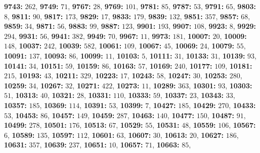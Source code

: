 \textsf{\bfseries 9743:} $262$, \textsf{\bfseries 9749:} $71$, \textsf{\bfseries 9767:} $28$, \textsf{\bfseries 9769:} $101$, \textsf{\bfseries 9781:} $85$, \textsf{\bfseries 9787:} $53$, \textsf{\bfseries 9791:} $65$, \textsf{\bfseries 9803:} $8$, \textsf{\bfseries 9811:} $90$, \textsf{\bfseries 9817:} $173$, \textsf{\bfseries 9829:} $17$, \textsf{\bfseries 9833:} $179$, \textsf{\bfseries 9839:} $132$, \textsf{\bfseries 9851:} $357$, \textsf{\bfseries 9857:} $68$, \textsf{\bfseries 9859:} $34$, \textsf{\bfseries 9871:} $56$, \textsf{\bfseries 9883:} $99$, \textsf{\bfseries 9887:} $123$, \textsf{\bfseries 9901:} $193$, \textsf{\bfseries 9907:} $108$, \textsf{\bfseries 9923:} $8$, \textsf{\bfseries 9929:} $294$, \textsf{\bfseries 9931:} $56$, \textsf{\bfseries 9941:} $382$, \textsf{\bfseries 9949:} $70$, \textsf{\bfseries 9967:} $11$, \textsf{\bfseries 9973:} $181$, \textsf{\bfseries 10007:} $20$, \textsf{\bfseries 10009:} $148$, \textsf{\bfseries 10037:} $242$, \textsf{\bfseries 10039:} $582$, \textsf{\bfseries 10061:} $109$, \textsf{\bfseries 10067:} $45$, \textsf{\bfseries 10069:} $24$, \textsf{\bfseries 10079:} $55$, \textsf{\bfseries 10091:} $137$, \textsf{\bfseries 10093:} $86$, \textsf{\bfseries 10099:} $11$, \textsf{\bfseries 10103:} $5$, \textsf{\bfseries 10111:} $31$, \textsf{\bfseries 10133:} $31$, \textsf{\bfseries 10139:} $93$, \textsf{\bfseries 10141:} $34$, \textsf{\bfseries 10151:} $59$, \textsf{\bfseries 10159:} $86$, \textsf{\bfseries 10163:} $57$, \textsf{\bfseries 10169:} $240$, \textsf{\bfseries 10177:} $109$, \textsf{\bfseries 10181:} $215$, \textsf{\bfseries 10193:} $43$, \textsf{\bfseries 10211:} $329$, \textsf{\bfseries 10223:} $17$, \textsf{\bfseries 10243:} $58$, \textsf{\bfseries 10247:} $30$, \textsf{\bfseries 10253:} $280$, \textsf{\bfseries 10259:} $34$, \textsf{\bfseries 10267:} $32$, \textsf{\bfseries 10271:} $422$, \textsf{\bfseries 10273:} $11$, \textsf{\bfseries 10289:} $363$, \textsf{\bfseries 10301:} $93$, \textsf{\bfseries 10303:} $51$, \textsf{\bfseries 10313:} $40$, \textsf{\bfseries 10321:} $28$, \textsf{\bfseries 10331:} $110$, \textsf{\bfseries 10333:} $59$, \textsf{\bfseries 10337:} $23$, \textsf{\bfseries 10343:} $33$, \textsf{\bfseries 10357:} $185$, \textsf{\bfseries 10369:} $114$, \textsf{\bfseries 10391:} $53$, \textsf{\bfseries 10399:} $7$, \textsf{\bfseries 10427:} $185$, \textsf{\bfseries 10429:} $270$, \textsf{\bfseries 10433:} $53$, \textsf{\bfseries 10453:} $86$, \textsf{\bfseries 10457:} $149$, \textsf{\bfseries 10459:} $287$, \textsf{\bfseries 10463:} $140$, \textsf{\bfseries 10477:} $150$, \textsf{\bfseries 10487:} $91$, \textsf{\bfseries 10499:} $278$, \textsf{\bfseries 10501:} $176$, \textsf{\bfseries 10513:} $67$, \textsf{\bfseries 10529:} $55$, \textsf{\bfseries 10531:} $48$, \textsf{\bfseries 10559:} $106$, \textsf{\bfseries 10567:} $6$, \textsf{\bfseries 10589:} $135$, \textsf{\bfseries 10597:} $112$, \textsf{\bfseries 10601:} $63$, \textsf{\bfseries 10607:} $30$, \textsf{\bfseries 10613:} $20$, \textsf{\bfseries 10627:} $186$, \textsf{\bfseries 10631:} $357$, \textsf{\bfseries 10639:} $237$, \textsf{\bfseries 10651:} $10$, \textsf{\bfseries 10657:} $71$, \textsf{\bfseries 10663:} $85$, 
